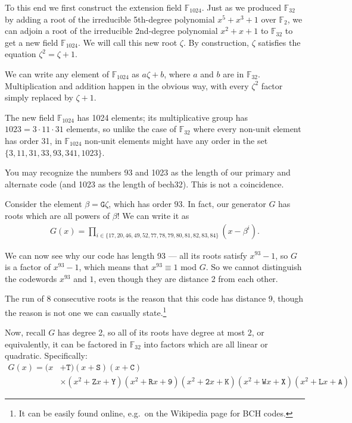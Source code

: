 \documentclass[letterpaper]{article}
\newcommand{\ftwo}{\mathbb{F}_2}
\newcommand{\fttwo}{\mathbb{F}_{32}}
\newcommand{\ftttwo}{\mathbb{F}_{1024}}
\newcommand{\vc}[1]{\texttt{#1}} %
\begin{document}
To this end we first construct the extension field $\ftttwo$. Just as we
produced $\fttwo$ by adding a root of the irreducible 5th-degree polynomial
$x^5 + x^3 + 1$ over $\ftwo$, we can adjoin a root of the irreducible
2nd-degree polynomial $x^2 + x + 1$ to $\fttwo$ to get a new field $\ftttwo$.
We will call this new root $\zeta$. By construction, $\zeta$ satisfies
the equation $\zeta^2 = \zeta + 1$.

We can write any element of $\ftttwo$ as $a\zeta + b$, where $a$ and $b$ are
in $\fttwo$. Multiplication and addition happen in the obvious way, with
every $\zeta^2$ factor simply replaced by $\zeta + 1$.

The new field $\ftttwo$ has 1024 elements; its multiplicative group has
$1023 = 3\cdot11\cdot31$ elements, so unlike the case of $\fttwo$ where every
non-unit element has order 31, in $\ftttwo$ non-unit elements might have any
order in the set $\{3, 11, 31, 33, 93, 341, 1023\}$.

You may recognize the numbers 93 and 1023 as the length of our primary and
alternate code (and 1023 as the length of bech32). This is not a coincidence.

Consider the element $\beta = \vc{G}\zeta$, which has order $93$. In fact, our
generator $G$ has roots which are all powers of $\beta$! We can write it as
\begin{align*}
    G(x) = \prod_{i\in\{17, 20, 46, 49, 52, 77, 78, 79, 80, 81, 82, 83, 84\}} (x - \beta^i).
\end{align*}

We can now see why our code has length 93 --- all its roots satisfy $x^{93}-1$,
so $G$ is a factor of $x^{93}-1$, which means that $x^{93}\equiv1$ mod $G$. So
we cannot distinguish the codewords $x^{93}$ and $1$, even though they are
distance 2 from each other.

The run of 8 consecutive roots is the reason that this code has distance 9, though
the reason is not one we can casually state.\footnote{It can be easily
found online, e.g.~on the Wikipedia page for BCH codes.}

Now, recall $G$ has degree 2, so all of its roots have degree at most 2, or
equivalently, it can be factored in $\fttwo$ into factors which are all linear
or quadratic. Specifically:
\begin{align*}
G(x) = (x &+ \vc{T})(x + \vc{S})(x + \vc{C}) \\
    &\times (x^2 + \vc{Z}x + \vc{Y})(x^2 + \vc{R}x + \vc{9})
    (x^2 + \vc{2}x + \vc{K})(x^2 + \vc{W}x + \vc{X})(x^2 + \vc{L}x + \vc{A})
\end{align*}
\end{document}

